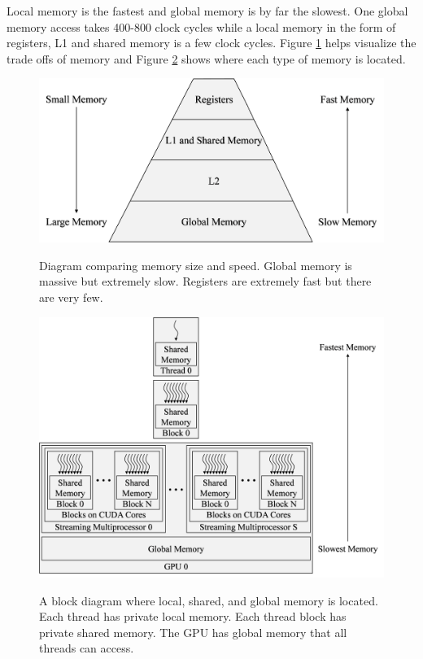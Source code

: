 Local memory is the fastest and global memory is by far the slowest.
One global memory access takes 400-800 clock cycles while a local memory in the form of registers, L1 and shared memory is a few clock cycles.
Figure \ref{fig:MemoryPyramid} helps visualize the trade offs of memory and 
Figure \ref{fig:fullGPUmemBlockDiagram} shows where each type of memory is located.
\begin{figure}
	\caption{Diagram comparing memory size and speed. Global memory is massive but extremely slow. Registers are extremely fast but there are very few.}
	\centering\includegraphics[width=8.36in/100*55]{figures/gpu_intro/MemoryPyramid.pdf}
	\label{fig:MemoryPyramid}
\end{figure}
\begin{figure}
	\caption{A block diagram where local, shared, and global memory is located. Each thread has private local memory. Each thread block has private shared memory. The GPU has global memory that all threads can access.}
	\centering\includegraphics[width=9.83in/100*55]{figures/gpu_intro/fullGPUmemBlockDiagram.pdf}
	\label{fig:fullGPUmemBlockDiagram}
\end{figure}

